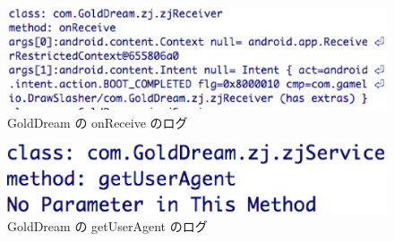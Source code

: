 \begin{figure}[t]
\begin{center}
\graphicspath{{./epsfiles/}}
\includegraphics[scale=0.5]{onreceivezjservice.eps}
\end{center}
\caption{GoldDream の onReceive のログ}
\label{zjservicereceive}
\end{figure}

\begin{figure}[t]
\begin{center}
\graphicspath{{./epsfiles/}}
\includegraphics[scale=0.3]{getuseragentzjservice.eps}
\end{center}
\caption{GoldDream の getUserAgent のログ}
\label{zjserviceuseragent}
\end{figure}


